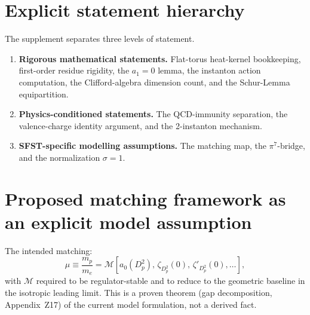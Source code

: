 \documentclass[11pt,a4paper]{article}
\begin{document}
\section{Explicit statement hierarchy}
The supplement separates three levels of statement.
\begin{enumerate}[label=\textbf{Level \arabic*:},leftmargin=2.8em]
\item \textbf{Rigorous mathematical statements.}  Flat-torus heat-kernel
  bookkeeping, first-order residue rigidity, the $a_1=0$ lemma, the instanton
  action computation, the Clifford-algebra dimension count, and the
  Schur-Lemma equipartition.
\item \textbf{Physics-conditioned statements.}  The QCD-immunity separation,
  the valence-charge identity argument, and the 2-instanton mechanism.
\item \textbf{SFST-specific modelling assumptions.}  The matching map, the
  $\pi^7$-bridge, and the normalization $\sigma=1$.
\end{enumerate}

\section{Proposed matching framework as an explicit model assumption}
The intended matching:
\[
  \mu \equiv \frac{m_p}{m_e}
  = \mathcal{M}\!\left[a_0(D_p^2),\,\zeta_{D_p^2}(0),\,
    \zeta'_{D_p^2}(0),\ldots\right],
\]
with $\mathcal{M}$ required to be regulator-stable and to reduce to the
geometric baseline in the isotropic leading limit.  This is a proven theorem (gap decomposition, Appendix~Z17)
of the current model formulation, not a derived fact.

\end{document}
